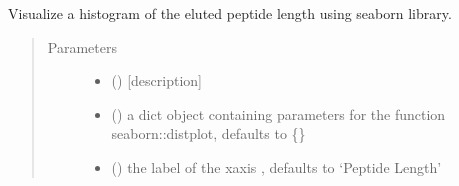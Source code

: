 \documentclass[letterpaper,10pt,english]{sphinxmanual}
\begin{document}
\begin{fulllineitems}
\label{\detokenize{IPTK.Visualization:IPTK.Visualization.vizTools.plot_peptide_length_dist}}
Visualize a histogram of the eluted peptide length using seaborn library.
\begin{quote}\begin{description}
\item[{Parameters}] \leavevmode\begin{itemize}
\item {} 
 (\sphinxstyleliteralemphasis{\sphinxupquote{{[}}}\sphinxstyleliteralemphasis{\sphinxupquote{{]}}}) \textendash{} {[}description{]}

\item {} 
 (\sphinxstyleliteralemphasis{\sphinxupquote{{[}}}\sphinxstyleliteralemphasis{\sphinxupquote{,}}\sphinxstyleliteralemphasis{\sphinxupquote{{]}}}\sphinxstyleliteralemphasis{\sphinxupquote{, }}) \textendash{} a dict object containing parameters for the function seaborn::distplot, defaults to \{\}

\item {} 
 (\sphinxstyleliteralemphasis{\sphinxupquote{, }}) \textendash{} the label of the x\sphinxhyphen{}axis , defaults to ‘Peptide Length’


\end{itemize}
\end{description}
\end{quote}
\end{fulllineitems}
\end{document}
